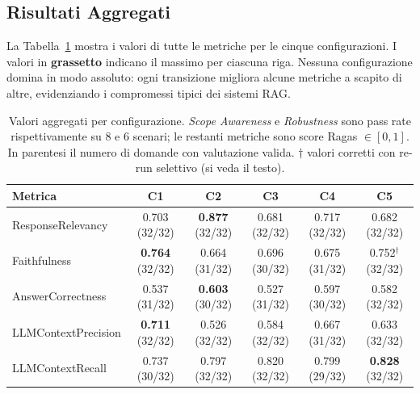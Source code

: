 \documentclass[11pt,a4paper]{article}
\begin{document}
\subsection{Risultati Aggregati}
\label{subsec:eval_results_table}

La Tabella~\ref{tab:allresults} mostra i valori di tutte le metriche per le cinque
configurazioni. I valori in \textbf{grassetto} indicano il massimo per ciascuna riga.
Nessuna configurazione domina in modo assoluto: ogni transizione migliora alcune
metriche a scapito di altre, evidenziando i compromessi tipici dei sistemi RAG.

\begin{table}[H]
\centering
\caption{Valori aggregati per configurazione. \textit{Scope Awareness} e
         \textit{Robustness} sono pass rate rispettivamente su 8 e 6 scenari;
         le restanti metriche sono score Ragas $\in[0,1]$. In parentesi il numero
         di domande con valutazione valida. $\dagger$ valori corretti con re-run
         selettivo (si veda il testo).}
\label{tab:allresults}
\small
\begin{tabular}{@{}lccccc@{}}
\toprule
\textbf{Metrica} & \textbf{C1} & \textbf{C2} & \textbf{C3} & \textbf{C4} & \textbf{C5} \\
\midrule
\rowcolor{blue!4}
ResponseRelevancy   & 0.703 \scriptsize(32/32) & \textbf{0.877} \scriptsize(32/32)
                    & 0.681 \scriptsize(32/32) & 0.717 \scriptsize(32/32)
                    & 0.682 \scriptsize(32/32) \\
Faithfulness        & \textbf{0.764} \scriptsize(32/32) & 0.664 \scriptsize(31/32)
                    & 0.696 \scriptsize(30/32) & 0.675 \scriptsize(31/32)
                    & 0.752$^\dagger$ \scriptsize(32/32) \\
\rowcolor{blue!4}
AnswerCorrectness   & 0.537 \scriptsize(31/32) & \textbf{0.603} \scriptsize(30/32)
                    & 0.527 \scriptsize(31/32) & 0.597 \scriptsize(30/32)
                    & 0.582 \scriptsize(32/32) \\
LLMContextPrecision & \textbf{0.711} \scriptsize(32/32) & 0.526 \scriptsize(32/32)
                    & 0.584 \scriptsize(32/32) & 0.667 \scriptsize(31/32)
                    & 0.633 \scriptsize(32/32) \\
\rowcolor{blue!4}
LLMContextRecall    & 0.737 \scriptsize(30/32) & 0.797 \scriptsize(32/32)
                    & 0.820 \scriptsize(32/32) & 0.799 \scriptsize(29/32)
                    & \textbf{0.828} \scriptsize(32/32) \\

\end{tabular}
\end{table}
\end{document}
